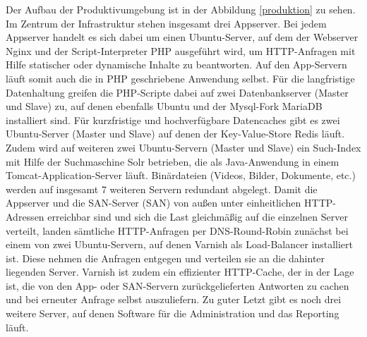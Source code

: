 Der Aufbau der Produktivumgebung ist in der Abbildung \ref{produktion} zu sehen. Im Zentrum der Infrastruktur stehen insgesamt drei Appserver. Bei jedem Appserver handelt es sich dabei um einen Ubuntu-Server, auf dem der Webserver Nginx \citep{nginx:001} und der Script-Interpreter \ac{PHP} \citep{php:001} ausgeführt wird, um HTTP-Anfragen mit Hilfe statischer oder dynamische Inhalte zu beantworten. Auf den App-Servern läuft somit auch die in \ac{PHP} geschriebene Anwendung selbst. Für die langfristige Datenhaltung greifen die PHP-Scripte dabei auf zwei Datenbankserver (Master und Slave) zu, auf denen ebenfalls Ubuntu und der Mysql-Fork MariaDB \citep{mariadb:001} installiert sind. Für kurzfristige und hochverfügbare Datencaches gibt es zwei Ubuntu-Server (Master und Slave) auf denen der Key-Value-Store Redis \citep{redis:001} läuft. Zudem wird auf weiteren zwei Ubuntu-Servern (Master und Slave) ein Such-Index mit Hilfe der Suchmaschine Solr \citep{solr:001} betrieben, die als Java-Anwendung in einem Tomcat-Application-Server \citep{tomcat:001} läuft. Binärdateien (Videos, Bilder, Dokumente, etc.) werden auf insgesamt 7 weiteren Servern redundant abgelegt. Damit die Appserver und die SAN-Server (\acl{SAN}) von außen unter einheitlichen HTTP-Adressen erreichbar sind und sich die Last gleichmäßig auf die einzelnen Server verteilt, landen sämtliche HTTP-Anfragen per DNS-Round-Robin zunächst bei einem von zwei Ubuntu-Servern, auf denen Varnish \citep{varnish:001} als Load-Balancer installiert ist. Diese nehmen die Anfragen entgegen und verteilen sie an die dahinter liegenden Server. Varnish ist zudem ein effizienter HTTP-Cache, der in der Lage ist, die von den App- oder SAN-Servern zurückgelieferten Antworten zu cachen und bei erneuter Anfrage selbst auszuliefern. Zu guter Letzt gibt es noch drei weitere Server, auf denen Software für die Administration und das Reporting läuft.

